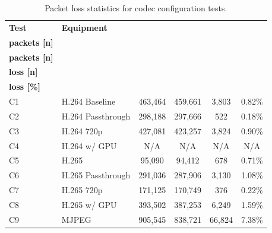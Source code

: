 \begin{table}[H]
    \centering
    \caption{Packet loss statistics for codec configuration tests.}\label{tab:packetloss_codec}
    \begin{tabular}{|l|l|c|c|c|c|}
    \hline
    \textbf{Test} & \textbf{Equipment} & \shortstack{\textbf{Sent}\\ \textbf{packets [n]}} & \shortstack{\textbf{Received}\\\textbf{packets [n]}} & \shortstack{\textbf{Packet}\\\textbf{loss [n]}} & \shortstack{\textbf{Packet}\\\textbf{loss [\%]}} \\
    \hline
    C1 & H.264 Baseline & 463,464 & 459,661 & 3,803 & 0.82\% \\
    \hline
    C2 & H.264 Passthrough & 298,188 & 297,666 & 522 & 0.18\% \\
    \hline
    C3 & H.264 720p & 427,081 & 423,257 & 3,824 & 0.90\% \\
    \hline
    C4 & H.264 w/ GPU & N/A & N/A & N/A & N/A \\
    \hline
    C5 & H.265 & 95,090 & 94,412 & 678 & 0.71\% \\
    \hline
    C6 & H.265 Passthrough & 291,036 & 287,906 & 3,130 & 1.08\% \\
    \hline
    C7 & H.265 720p & 171,125 & 170,749 & 376 & 0.22\% \\
    \hline
    C8 & H.265 w/ GPU & 393,502 & 387,253 & 6,249 & 1.59\% \\
    \hline
    C9 & MJPEG & 905,545 & 838,721 & 66,824 & 7.38\% \\
    \hline
    \end{tabular}
\end{table}
